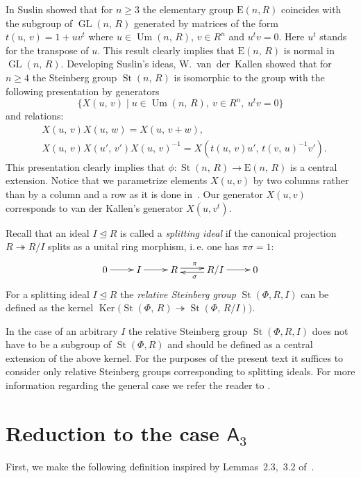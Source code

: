 \documentclass[11pt]{amsart}
\theoremstyle{plain} \declaretheorem[name=Theorem, Refname={Theorem,Theorems}]{tm} \Crefname{tm}{Theorem}{Theorems}
\numberwithin{equation}{section}
\theoremstyle{definition} \newtheorem{df}[lm]{Definition} \Crefname{df}{Definition}{Definitions}
\theoremstyle{remark} \newtheorem{rk}[lm]{Remark} \Crefname{rk}{Remark}{Remarks}
\newcommand{\Ker}{\mathop{\mathrm{Ker}}\nolimits}
\newcommand{\E}{{\mathrm{E}}}
\newcommand{\Um}{\mathop{\mathrm{Um}}\nolimits}
\newcommand{\St}{\mathop{\mathrm{St}}\nolimits}
\newcommand{\GL}{\mathop{\mathrm{GL}}\nolimits}
\newcommand{\epi}{\twoheadrightarrow}
\newcommand{\inv}{^{-1}}
\newcommand{\rA}{\mathsf{A}}
\begin{document}
In \cite{Sus} Suslin showed that for $n\geq 3$ the elementary group $\E(n, R)$ coincides with the subgroup of $\GL(n,\,R)$ generated by matrices
of the form $t(u,\,v)=1+uv^t$ where $u\in\Um(n,\,R)$, $v\in R^n$ and $u^tv=0$. Here $u^t$ stands for the transpose of $u$.
This result clearly implies that $\E(n,\,R)$ is normal in $\GL(n,\,R)$.
Developing Suslin's ideas, W.~van~der~Kallen showed that for $n\geq4$ the Steinberg group $\St(n,\,R)$ is isomorphic to the group with the following presentation by generators
$$\{X(u,\,v)\mid u\in\Um(n,\,R),\ v\in R^n,\ u^tv=0\}$$ and relations:
\setcounter{equation}{0} \renewcommand{\theequation}{K\arabic{equation}}
\begin{align}
&X(u,\,v)X(u,\,w)=X(u,\,v+w), \label{add1} \\
&X(u,\,v)X(u',\,v')X(u,\,v)\inv=X(t(u,\,v)u',\,t(v,\,u)\inv v'). \label{conj1}
\end{align}
This presentation clearly implies that $\phi\colon\St(n,\,R)\rightarrow\E(n,\,R)$ is a central extension.
Notice that we parametrize elements $X(u, v)$ by two columns rather than by a column and a row as it is done in~\cite{vdK}.
Our generator $X(u,v)$ corresponds to van der Kallen's generator $X(u, v^t)$.

Recall that an ideal $I\trianglelefteq R$ is called a \emph{splitting ideal} if the canonical projection $R \twoheadrightarrow R/I$ splits as a unital ring morphism, i.\,e. one has $\pi\sigma=1$:
$$\xymatrix{0\ar@<0.1ex>[r]^{}&I\ar@<0.1ex>[r]^{}&R\ar@<0.5ex>[r]^{\pi}&R/I\ar@<0.5ex>[l]^{\sigma}\ar@<0.1ex>[r]^{}&0}$$
For a splitting ideal $I\trianglelefteq R$ the \emph{relative Steinberg group} $\St(\Phi, R, I)$ can be defined as the kernel $\Ker\big(\St(\Phi,\,R)\epi\St(\Phi,\,R/I)\big)$.

In the case of an arbitrary $I$ the relative Steinberg group $\St(\Phi, R, I)$ does not have to be a subgroup of $\St(\Phi, R)$ and should be defined as a central extension of the above kernel.
For the purposes of the present text it suffices to consider only relative Steinberg groups corresponding to splitting ideals.
For more information regarding the general case we refer the reader to \cite[Section~3]{SCh}.

\section{Reduction to the case \texorpdfstring{$\rA_3$}{A3}} \label{sec:patching}
First, we make the following definition inspired by Lemmas~2.3,~3.2 of~\cite{Tul}.
\end{document}
